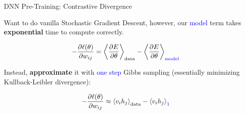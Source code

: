\documentclass[notes]{beamer}
\newcommand{\partialDx}[2]{\frac{\partial #1}{ \partial #2  }}
\newcommand{\inAngle}[1]{\left \langle #1 \right \rangle}
\begin{document}
\begin{frame}{DNN Pre-Training: Contrastive Divergence}
		\begin{center}
			Want to do vanilla Stochastic Gradient Descent, however, our \textcolor{blue}{model} term takes \textbf{exponential} time to compute correctly. 
		\end{center}
		
		\begin{equation*}
			- \partialDx{\ell(\theta)}{w_{ij}} = \inAngle{ \partialDx{E}{\theta} }_\text{data} - \inAngle{ \partialDx{E}{\theta} }_\text{\textcolor{blue}{model}}
		\end{equation*}
		
		\begin{center}
			Instead, \textbf{approximate} it with \textcolor{blue}{one step} Gibbs sampling (essentially minimizing Kullback-Leibler divergence):
		\end{center}
		
		\begin{equation*}
			- \partialDx{\ell(\theta)}{w_{ij}} \approx \inAngle{ v_i h_j }_\text{data} - \inAngle{ v_i h_j }_\text{\textcolor{blue}{1}}
		\end{equation*}
\end{frame}
\end{document}
